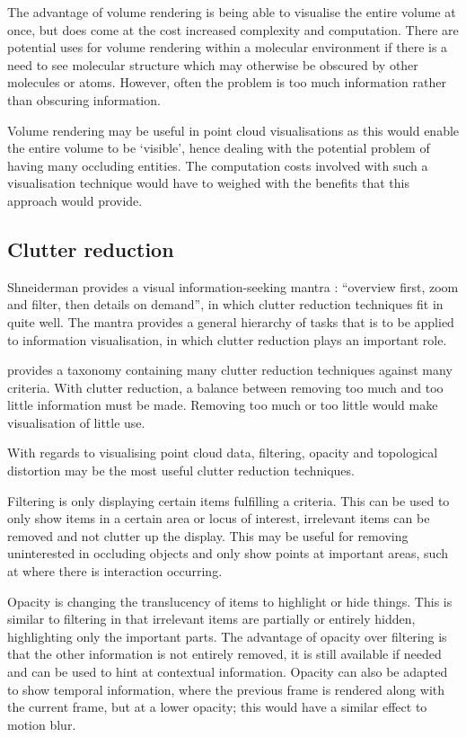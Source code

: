 \documentclass[twocolumn,a4paper]{article}
\begin{document}
The advantage of volume rendering is being able to visualise the entire volume
at once, but does come at the cost increased complexity and computation. There
are potential uses for volume rendering within a molecular environment if there
is a need to see molecular structure which may otherwise be obscured by other
molecules or atoms. However, often the problem is too much information rather
than obscuring information.

Volume rendering may be useful in point cloud visualisations as this would
enable the entire volume to be `visible', hence dealing with the potential
problem of having many occluding entities. The computation costs involved with
such a visualisation technique would have to weighed with the benefits that this
approach would provide.

\subsection*{Clutter reduction}
Shneiderman provides a visual information-seeking mantra \citep{shneiderman96}:
``overview first, zoom and filter, then details on demand'', in which clutter
reduction techniques fit in quite well. The mantra provides a general hierarchy
of tasks that is to be applied to information visualisation, in which clutter
reduction plays an important role.

\citet{ellis07} provides a taxonomy containing many clutter reduction techniques
against many criteria. With clutter reduction, a balance between removing too
much and too little information must be made. Removing too much or too little
would make visualisation of little use.

With regards to visualising point cloud data, filtering, opacity and topological
distortion may be the most useful clutter reduction techniques.

Filtering is only displaying certain items fulfilling a criteria. This can be
used to only show items in a certain area or locus of interest, irrelevant items
can be removed and not clutter up the display. This may be useful for removing
uninterested in occluding objects and only show points at important areas, such
at where there is interaction occurring.

Opacity is changing the translucency of items to highlight or hide things. This
is similar to filtering in that irrelevant items are partially or entirely
hidden, highlighting only the important parts. The advantage of opacity over
filtering is that the other information is not entirely removed, it is still
available if needed and can be used to hint at contextual information. Opacity
can also be adapted to show temporal information, where the previous frame is
rendered along with the current frame, but at a lower opacity; this would have a
similar effect to motion blur.
\end{document}
